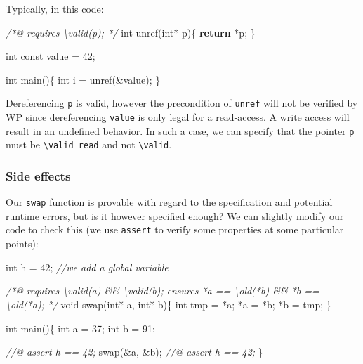 \documentclass[12pt,francais,]{scrbook}
\newenvironment{Shaded}{}{}
\newcommand{\KeywordTok}[1]{\textcolor[rgb]{0.00,0.44,0.13}{\textbf{{#1}}}}
\newcommand{\DataTypeTok}[1]{\textcolor[rgb]{0.56,0.13,0.00}{{#1}}}
\newcommand{\DecValTok}[1]{\textcolor[rgb]{0.25,0.63,0.44}{{#1}}}
\newcommand{\CommentTok}[1]{\textcolor[rgb]{0.38,0.63,0.69}{\textit{{#1}}}}
\newcommand{\NormalTok}[1]{{#1}}
\begin{document}
Typically, in this code:

\begin{footnotesize}\begin{Shaded}
\begin{Highlighting}[]
\CommentTok{/*@ requires \textbackslash{}valid(p); */}
\DataTypeTok{int} \NormalTok{unref(}\DataTypeTok{int}\NormalTok{* p)\{}
  \KeywordTok{return} \NormalTok{*p;}
\NormalTok{\}}

\DataTypeTok{int} \DataTypeTok{const} \NormalTok{value = }\DecValTok{42}\NormalTok{;}

\DataTypeTok{int} \NormalTok{main()\{}
  \DataTypeTok{int} \NormalTok{i = unref(&value);}
\NormalTok{\}}
\end{Highlighting}
\end{Shaded}\end{footnotesize}

Dereferencing \texttt{p} is valid, however the precondition of
\texttt{unref} will not be verified by WP since dereferencing
\texttt{value} is only legal for a read-access. A write access will
result in an undefined behavior. In such a case, we can specify that the
pointer \texttt{p} must be \texttt{\textbackslash{}valid\_read} and not
\texttt{\textbackslash{}valid}.

\subsubsection{Side effects}\label{side-effects}

Our \texttt{swap} function is provable with regard to the specification
and potential runtime errors, but is it however specified enough? We can
slightly modify our code to check this (we use \texttt{assert} to verify
some properties at some particular points):

\begin{footnotesize}\begin{Shaded}
\begin{Highlighting}[]
\DataTypeTok{int} \NormalTok{h = }\DecValTok{42}\NormalTok{; }\CommentTok{//we add a global variable}

\CommentTok{/*@}
\CommentTok{  requires \textbackslash{}valid(a) && \textbackslash{}valid(b);}
\CommentTok{  ensures  *a == \textbackslash{}old(*b) && *b == \textbackslash{}old(*a);}
\CommentTok{*/}
\DataTypeTok{void} \NormalTok{swap(}\DataTypeTok{int}\NormalTok{* a, }\DataTypeTok{int}\NormalTok{* b)\{}
  \DataTypeTok{int} \NormalTok{tmp = *a;}
  \NormalTok{*a = *b;}
  \NormalTok{*b = tmp;}
\NormalTok{\}}

\DataTypeTok{int} \NormalTok{main()\{}
  \DataTypeTok{int} \NormalTok{a = }\DecValTok{37}\NormalTok{;}
  \DataTypeTok{int} \NormalTok{b = }\DecValTok{91}\NormalTok{;}

  \CommentTok{//@ assert h == 42;}
  \NormalTok{swap(&a, &b);}
  \CommentTok{//@ assert h == 42;}
\NormalTok{\}}
\end{Highlighting}
\end{Shaded}\end{footnotesize}
\end{document}
